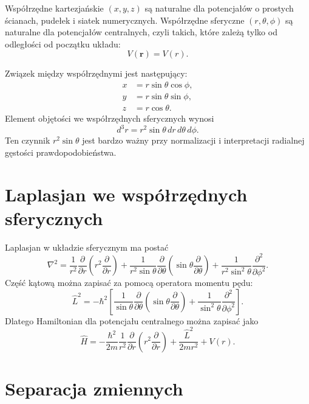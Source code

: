 Współrzędne kartezjańskie \((x,y,z)\) są naturalne dla potencjałów o prostych ścianach, pudełek i siatek numerycznych. Współrzędne sferyczne \((r,\theta,\phi)\) są naturalne dla potencjałów centralnych, czyli takich, które zależą tylko od odległości od początku układu:
\begin{equation}
    V(\mathbf{r})=V(r).
\end{equation}

Związek między współrzędnymi jest następujący:
\begin{align}
    x&=r\sin\theta\cos\phi,\\
    y&=r\sin\theta\sin\phi,\\
    z&=r\cos\theta.
\end{align}
Element objętości we współrzędnych sferycznych wynosi
\begin{equation}
    d^3r=r^2\sin\theta\,dr\,d\theta\,d\phi.
\end{equation}
Ten czynnik \(r^2\sin\theta\) jest bardzo ważny przy normalizacji i interpretacji radialnej gęstości prawdopodobieństwa.

\section{Laplasjan we współrzędnych sferycznych}

Laplasjan w układzie sferycznym ma postać
\begin{equation}
    \nabla^2=\frac{1}{r^2}\frac{\partial}{\partial r}\left(r^2\frac{\partial}{\partial r}\right)
    +\frac{1}{r^2\sin\theta}\frac{\partial}{\partial\theta}\left(\sin\theta\frac{\partial}{\partial\theta}\right)
    +\frac{1}{r^2\sin^2\theta}\frac{\partial^2}{\partial\phi^2}.
\end{equation}
Część kątową można zapisać za pomocą operatora momentu pędu:
\begin{equation}
    \hat{L}^2=-\hbar^2\left[
    \frac{1}{\sin\theta}\frac{\partial}{\partial\theta}\left(\sin\theta\frac{\partial}{\partial\theta}\right)
    +\frac{1}{\sin^2\theta}\frac{\partial^2}{\partial\phi^2}
    \right].
\end{equation}
Dlatego Hamiltonian dla potencjału centralnego można zapisać jako
\begin{equation}
    \hat{H}=-\frac{\hbar^2}{2m}\frac{1}{r^2}\frac{\partial}{\partial r}\left(r^2\frac{\partial}{\partial r}\right)
    +\frac{\hat{L}^2}{2mr^2}+V(r).
\end{equation}

\section{Separacja zmiennych}


